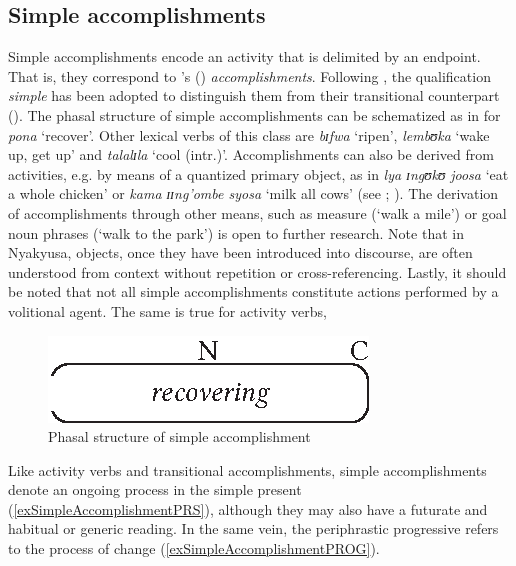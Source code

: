 \subsection{Simple accomplishments}\label{VerbalClassSimpleAccomplishment}
Simple accomplishments encode an activity that is delimited by an endpoint. That is, they correspond to \citeauthor{VendlerZ1957}'s (\citeyear{VendlerZ1957}) \textit{accomplishments}. Following \citet{BotneR2008}, the qualification \textit{simple} has been adopted to distinguish them from their transitional counterpart (). The phasal structure of simple accomplishments can be schematized as in  for \textit{pona} \lq recover'. Other lexical verbs of this class are \textit{bɪfwa} \lq ripen', \textit{lembʊka} \lq wake up, get up' and \textit{talalɪla} \lq cool (intr.)'. Accomplishments can also be derived from activities, e.g. by means of a quantized primary object, as in \textit{lya ɪngʊkʊ joosa} \lq eat a whole chicken' or \textit{kama ɪɪng'ombe syosa} \lq milk all cows' (see \citealt{VerkuylH1972}; \citealt{DowtyD1979}). The derivation of accomplishments through other means, such as measure (\lq walk a mile') or goal noun phrases (\lq walk to the park') is open to further research. Note that in Nyakyusa, objects, once they have been introduced into discourse, are often understood from context without repetition or cross-referencing. Lastly, it should be noted that not all simple accomplishments constitute actions performed by a volitional agent. The same is true for activity verbs,

\begin{figure}[h]
\begin{center}
\includegraphics{figures/GrafikSimpleAccomplishment.eps}
\end{center}
\caption{Phasal structure of simple accomplishment}
\label{FigureSimpleAccomplishment}
\end{figure}
Like activity verbs and transitional accomplishments, simple accomplishments denote an ongoing process in the simple present (\ref{exSimpleAccomplishmentPRS}), although they may also have a futurate and habitual or generic reading. In the same vein, the periphrastic progressive refers to the process of change (\ref{exSimpleAccomplishmentPROG}).

